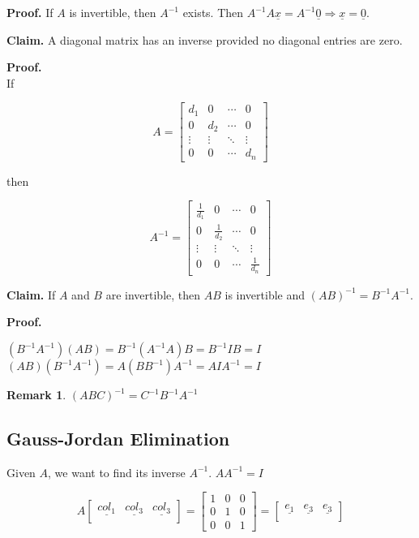 \documentclass[12pt,a4paper]{article}
\newtheorem*{rem}{Remark}
\newcommand{\Remark}[1]{
  \begin{rem}
    \color{cyan}
    #1
  \end{rem}
}
\begin{document}
\textbf{Proof.} If $A$ is invertible, then $A^{-1}$ exists.
Then $A^{-1}A\underline{x} = A^{-1}\underline{0} \Rightarrow \underline{x} = \underline{0}$.

\textbf{Claim.} A diagonal matrix has an inverse provided no diagonal entries are zero.

\textbf{Proof.} \\
If

\[
A = \begin{bmatrix}
  d_1 & 0 & \cdots & 0 \\
  0 & d_2 & \cdots & 0 \\
  \vdots & \vdots & \ddots & \vdots \\
  0 & 0 & \cdots & d_n
\end{bmatrix}
\]

then

\[
A^{-1} = \begin{bmatrix}
  \frac{1}{d_1} & 0 & \cdots & 0 \\
  0 & \frac{1}{d_2} & \cdots & 0 \\
  \vdots & \vdots & \ddots & \vdots \\
  0 & 0 & \cdots & \frac{1}{d_n}
\end{bmatrix}
\]

\textbf{Claim.} If $A$ and $B$ are invertible, then $AB$ is invertible and $(AB)^{-1} = B^{-1}A^{-1}$.

\textbf{Proof.} 

$(B^{-1}A^{-1})(AB) = B^{-1}(A^{-1}A)B = B^{-1}IB = I$ \\
$(AB)(B^{-1}A^{-1}) = A(BB^{-1})A^{-1} = AIA^{-1} = I$

\Remark{$(ABC)^{-1} = C^{-1}B^{-1}A^{-1}$}

\subsection*{Gauss-Jordan Elimination}

Given $A$, we want to find its inverse $A^{-1}$. $AA^{-1} = I$

\[
A
\begin{bmatrix}
  \underline{col_1} & \underline{col_3} & \underline{col_3} \\
\end{bmatrix} = 
\begin{bmatrix}
  1 & 0 & 0 \\
  0 & 1 & 0 \\
  0 & 0 & 1
\end{bmatrix} = 
\begin{bmatrix}
  \underline{e_1} & \underline{e_3} & \underline{e_3} \\
\end{bmatrix}
\]
\end{document}
